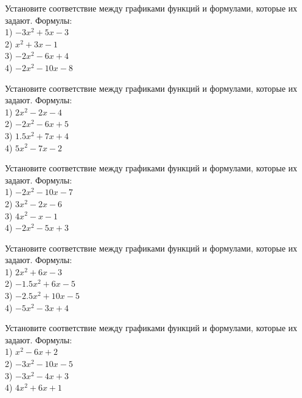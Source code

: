 \documentclass[4apaper]{article}
\begin{document}
\begin{taskBN}{63}
Установите соответствие между графиками функций и формулами, которые их задают. Формулы: \\1) $-3x^2+5x-3$\\2) $x^2+3x-1$\\3) $-2x^2-6x+4$\\4) $-2x^2-10x-8$
\end{taskBN}

\begin{taskBN}{64}
Установите соответствие между графиками функций и формулами, которые их задают. Формулы: \\1) $2x^2-2x-4$\\2) $-2x^2-6x+5$\\3) $1.5x^2+7x+4$\\4) $5x^2-7x-2$
\end{taskBN}

\begin{taskBN}{65}
Установите соответствие между графиками функций и формулами, которые их задают. Формулы: \\1) $-2x^2-10x-7$\\2) $3x^2-2x-6$\\3) $4x^2-x-1$\\4) $-2x^2-5x+3$
\end{taskBN}

\begin{taskBN}{66}
Установите соответствие между графиками функций и формулами, которые их задают. Формулы: \\1) $2x^2+6x-3$\\2) $-1.5x^2+6x-5$\\3) $-2.5x^2+10x-5$\\4) $-5x^2-3x+4$
\end{taskBN}

\begin{taskBN}{67}
Установите соответствие между графиками функций и формулами, которые их задают. Формулы: \\1) $x^2-6x+2$\\2) $-3x^2-10x-5$\\3) $-3x^2-4x+3$\\4) $4x^2+6x+1$
\end{taskBN}
\end{document}
